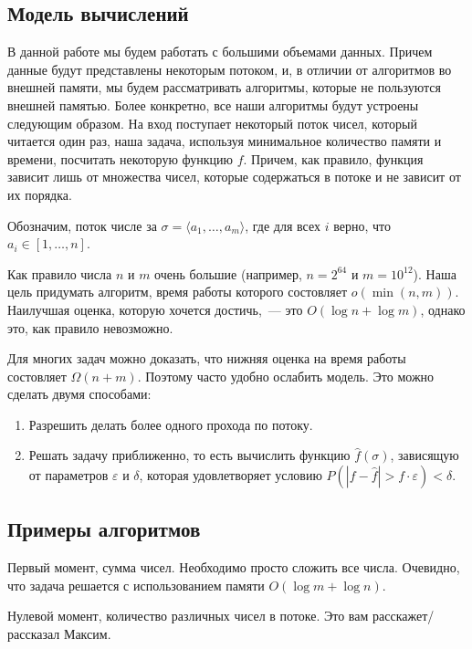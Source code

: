 \documentclass{article}
\newcommand{\abs}[1]{\left| #1 \right|}
\renewcommand{\epsilon}{\varepsilon}
\begin{document}
\subsection{Модель вычислений}
В данной работе мы будем работать с большими объемами данных.
Причем данные будут представлены некоторым потоком, и,
в отличии от алгоритмов во внешней памяти, мы будем рассматривать
алгоритмы, которые не пользуются внешней памятью.
Более конкретно, все наши алгоритмы будут устроены следующим образом.
На вход поступает некоторый поток чисел, который читается один раз,
наша задача, используя минимальное количество памяти и времени,
посчитать некоторую функцию $f$.  Причем, как правило, функция
зависит лишь от множества чисел, которые содержаться в потоке и не зависит от их порядка.

Обозначим, поток числе за $\sigma = \langle a_1, \ldots, a_m \rangle$, где для всех $i$
верно, что $a_i \in [1, \ldots, n]$.

Как правило числа $n$ и $m$ очень большие (например, $n = 2^{64}$ и $m = 10^{12}$).
Наша цель придумать алгоритм, время работы которого состовляет $o\left(\min(n, m)\right)$.
Наилучшая оценка, которую хочется достичь,~--- это $O(\log n + \log m)$, однако это,
как правило невозможно.

Для многих задач можно доказать, что нижняя оценка на время работы состовляет $\Omega(n + m)$.
Поэтому часто удобно ослабить модель. Это можно сделать двумя способами:
\begin{enumerate}
\item
Разрешить делать более одного прохода по потоку.

\item
Решать задачу приближенно, то есть вычислить функцию $\hat{f}(\sigma)$,
зависящую от параметров $\epsilon$ и $\delta$, которая удовлетворяет условию
$P \left( \abs{f - \hat{f}}  > f \cdot \epsilon \right) < \delta$.
\end{enumerate}



\subsection{Примеры алгоритмов}

Первый момент, сумма чисел. Необходимо просто сложить все числа.
Очевидно, что задача решается с использованием памяти $O(\log m + \log n)$.

Нулевой момент, количество различных чисел в потоке. Это вам расскажет/рассказал Максим.
\end{document}

